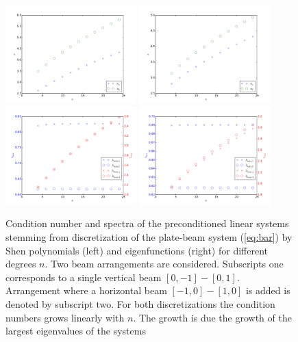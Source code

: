 \documentclass{marine_2015}
\begin{document}
 \begin{figure}[t]
 \centering
 \includegraphics[width=0.45\textwidth]{img/Precond_shen_cond}
 \includegraphics[width=0.45\textwidth]{img/Precond_sine_cond}\\
 \includegraphics[width=0.45\textwidth]{img/prec_shen_spectrum}
 \includegraphics[width=0.45\textwidth]{img/prec_sine_spectrum}\\
 \caption{
 Condition number and spectra of the preconditioned linear systems stemming from
 discretization of the plate-beam system (\ref{eq:bar}) by Shen polynomials
 (left) and eigenfunctions (right) for different degrees $n$. Two beam arrangements 
 are considered. Subscripts one corresponds to a single vertical beam
 $\left[0, -1\right]-\left[0, 1\right]$. Arrangement where a horizontal beam 
$\left[-1, 0\right]-\left[1, 0\right]$ is added is denoted by subscript two.
For both discretizations the condition numbers grows linearly with $n$. The
growth is due the growth of the largest eigenvalues of the systems}
 \label{fig:precond}
 \end{figure}
\end{document}
